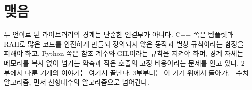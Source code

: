 \section{맺음}

두 언어로 된 라이브러리의 경계는 단순한 연결부가 아니다. C++ 쪽은 템플릿과 RAII로 많은 코드를 안전하게 만들되 정의되지 않은 동작과 별칭 규칙이라는 함정을 피해야 하고, Python 쪽은 참조 계수와 GIL이라는 규칙을 지켜야 하며, 경계 자체는 메모리를 복사 없이 넘기는 약속과 작은 호출의 고정 비용이라는 문제를 안고 있다. 2부에서 다룬 기계의 이야기는 여기서 끝난다. 3부부터는 이 기계 위에서 돌아가는 수치 알고리즘, 먼저 선형대수의 알고리즘으로 넘어간다.

\chapterreferences
